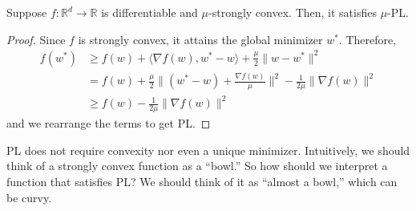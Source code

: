	\begin{lemma}
	  \label{thm:strong-convexity-implies-pl-inequality}
		Suppose $f: \mathbb{R}^d \to \mathbb{R}$ is differentiable and $\mu$-strongly convex. Then, it satisfies $\mu$-PL. 
	\end{lemma}
	\begin{proof}
	  Since $f$ is strongly convex, it attains the global minimizer $w^\ast$. Therefore, 
		\begin{align}
			f(w^\ast) & \geq f(w) + \langle \nabla f(w), w^\ast - w \rangle + \frac{\mu}{2} \| w - w^\ast \|^2 \\ 
								& = f(w) + \frac{\mu}{2} \bigg\| (w^\ast - w) + \frac{\nabla f(w)}{\mu} \bigg\|^2 - \frac{1}{2\mu} \|\nabla f(w) \|^2 \\ 
								& \geq f(w) - \frac{1}{2 \mu} \|\nabla f(w)\|^2
		\end{align}
		and we rearrange the terms to get PL. 
	\end{proof}

	PL does not require convexity nor even a unique minimizer. Intuitively, we should think of a strongly convex function as a ``bowl.'' So how should we interpret a function that satisfies PL? We should think of it as ``almost a bowl,'' which can be curvy. 

